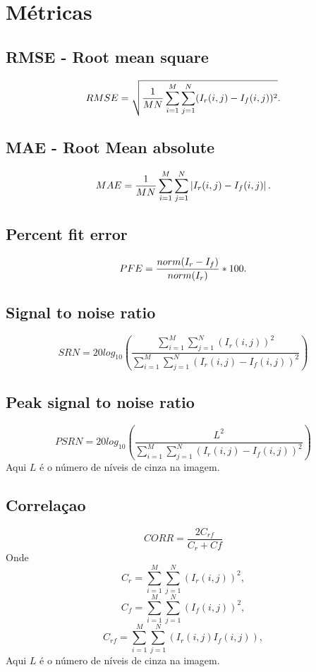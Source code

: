 \documentclass[conference]{IEEEtran}
\begin{document}
\section{Métricas}
\subsection{RMSE - Root mean square}
\begin{equation}
	RMSE=\sqrt{\frac{1}{MN}\sum_{i=1}^M\sum_{j=1}^N(I_r(i,j)-I_f(i,j))^2}.  \\
\end{equation}
\subsection{MAE - Root Mean absolute}
\begin{equation}
	MAE=\frac{1}{MN}\sum_{i=1}^M\sum_{j=1}^N\left|I_r(i,j)-I_f(i,j)\right|.  \\
\end{equation}
\subsection{Percent fit error}
\begin{equation}
	PFE=\frac{norm(I_r-I_f)}{norm(I_r)}*100.  \\
\end{equation}
\subsection{Signal to noise ratio}
\begin{equation}
SRN = 20log_{10}\left(\frac{\sum_{i=1}^M\sum_{j=1}^N(I_r(i,j))^2}{\sum_{i=1}^M\sum_{j=1}^N(I_r(i,j)-I_f(i,j))^2}\right)
\end{equation}
\subsection{Peak signal to noise ratio}
\begin{equation}
PSRN = 20log_{10}\left(\frac{L^2}{\sum_{i=1}^M\sum_{j=1}^N(I_r(i,j)-I_f(i,j))^2}\right)
\end{equation}
Aqui $L$ é o número de níveis de cinza na imagem. 
\subsection{Correlaçao}
\begin{equation}
CORR = \frac{2C_{rf}}{C_r+Cf}
\end{equation}
Onde $$C_r= \sum_{i=1}^M\sum_{j=1}^N(I_r(i,j))^2,$$ $$C_f=\sum_{i=1}^M\sum_{j=1}^N(I_f(i,j))^2,$$ $$C_{rf}=\sum_{i=1}^M\sum_{j=1}^N(I_r(i,j)I_f(i,j)),$$
Aqui $L$ é o número de níveis de cinza na imagem. 
\end{document}
